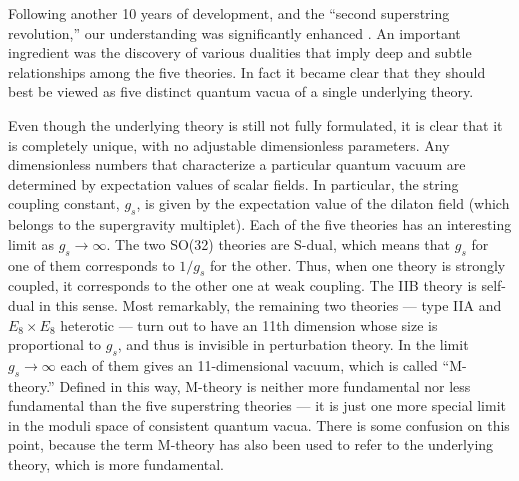 \documentclass[a4paper,12pt]{article}
\begin{document}
Following another 10 years of development, and the ``second
superstring revolution,'' our understanding was significantly
enhanced \cite{JP}.  An important ingredient was the discovery of various
dualities that imply deep and subtle relationships among the five
theories.  In fact it became clear that they should best be viewed
as five distinct quantum vacua of a single underlying theory.

Even though the underlying theory is still not fully formulated,
it is clear that it is completely unique, with no adjustable
dimensionless parameters. Any dimensionless numbers that
characterize a particular quantum vacuum are determined by
expectation values of scalar fields. In particular, the string
coupling constant, $g_s$, is given by the expectation value of the
dilaton field (which belongs to the supergravity multiplet).  Each
of the five theories has an interesting limit as $g_s \rightarrow
\infty$.  The two SO(32) theories are S-dual, which means that
$g_s$ for one of them corresponds to $1/g_s$ for the other.  Thus,
when one theory is strongly coupled, it corresponds to the other
one at weak coupling. The IIB theory is self-dual in this sense.
Most remarkably, the remaining two theories --- type IIA and $E_8
\times E_8$ heterotic
--- turn out to have an 11th dimension whose size is proportional
to $g_s$, and thus is invisible in perturbation theory.  In the
limit $g_s \rightarrow \infty$ each of them gives an
11-dimensional vacuum, which is called ``M-theory.''  Defined in
this way, M-theory is neither more fundamental nor less
fundamental than the five superstring theories --- it is just one
more special limit in the moduli space of consistent quantum
vacua.  There is some confusion on this point, because the term
M-theory has also been used to refer to the underlying theory,
which is more fundamental.
\end{document}
